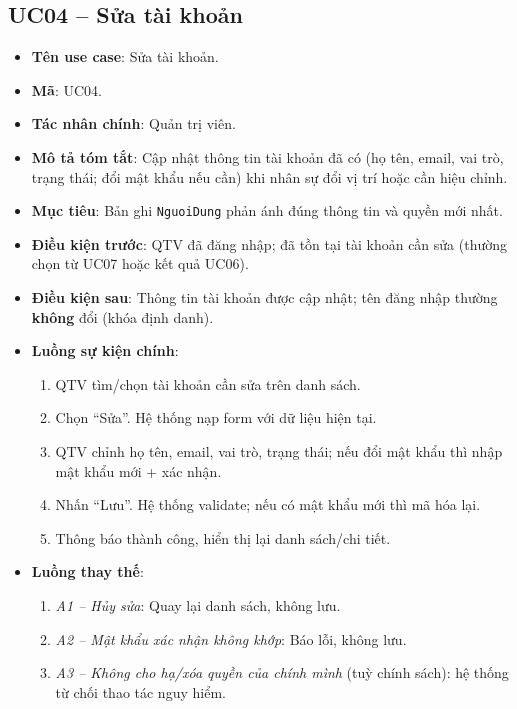 \subsection{UC04 -- Sửa tài khoản}

\begin{itemize}[leftmargin=1.5cm]
    \item \textbf{Tên use case}: Sửa tài khoản.
    \item \textbf{Mã}: UC04.
    \item \textbf{Tác nhân chính}: Quản trị viên.
    \item \textbf{Mô tả tóm tắt}: Cập nhật thông tin tài khoản đã có (họ tên, email, vai trò, trạng thái; đổi mật khẩu nếu cần) khi nhân sự đổi vị trí hoặc cần hiệu chỉnh.
    \item \textbf{Mục tiêu}: Bản ghi \texttt{NguoiDung} phản ánh đúng thông tin và quyền mới nhất.
    \item \textbf{Điều kiện trước}: QTV đã đăng nhập; đã tồn tại tài khoản cần sửa (thường chọn từ UC07 hoặc kết quả UC06).
    \item \textbf{Điều kiện sau}: Thông tin tài khoản được cập nhật; tên đăng nhập thường \textbf{không} đổi (khóa định danh).
    \item \textbf{Luồng sự kiện chính}:
    \begin{enumerate}
        \item QTV tìm/chọn tài khoản cần sửa trên danh sách.
        \item Chọn ``Sửa''. Hệ thống nạp form với dữ liệu hiện tại.
        \item QTV chỉnh họ tên, email, vai trò, trạng thái; nếu đổi mật khẩu thì nhập mật khẩu mới + xác nhận.
        \item Nhấn ``Lưu''. Hệ thống validate; nếu có mật khẩu mới thì mã hóa lại.
        \item Thông báo thành công, hiển thị lại danh sách/chi tiết.
    \end{enumerate}
    \item \textbf{Luồng thay thế}:
    \begin{enumerate}
        \item \textit{A1 -- Hủy sửa}: Quay lại danh sách, không lưu.
        \item \textit{A2 -- Mật khẩu xác nhận không khớp}: Báo lỗi, không lưu.
        \item \textit{A3 -- Không cho hạ/xóa quyền của chính mình} (tuỳ chính sách): hệ thống từ chối thao tác nguy hiểm.
    \end{enumerate}
\end{itemize}


